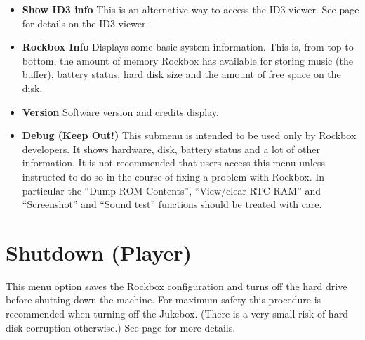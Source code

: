 \begin{itemize}

\item \textbf{Show ID3 info}
This is an alternative way to access the ID3 viewer.  See page \pageref{ref:ID3viewer} for details on the ID3 viewer.
\item \textbf{Rockbox Info}
Displays some basic system information.  This is, from top to bottom, the amount of memory Rockbox has available for storing music (the buffer), battery status, hard disk size and the amount of free space on the disk.

\item \textbf{Version}
Software version and credits display.

\item \textbf{Debug (Keep Out!)}
This submenu is intended to be used only by Rockbox developers. It shows hardware, disk, battery status and a lot of other information.  It is not recommended that users access this menu unless instructed to do so in the course of fixing a problem with Rockbox.  In particular the ``Dump ROM Contents'', ``View/clear RTC RAM'' and ``Screenshot'' and ``Sound test'' functions should be treated with care.
\end{itemize}

\section{Shutdown (Player)}
This menu option saves the Rockbox configuration and turns off the hard drive before shutting down the machine. For maximum safety this procedure is recommended when turning off the Jukebox. (There is a very small risk of hard disk corruption otherwise.) See page \pageref{ref:Safeshutdown} for more details.
